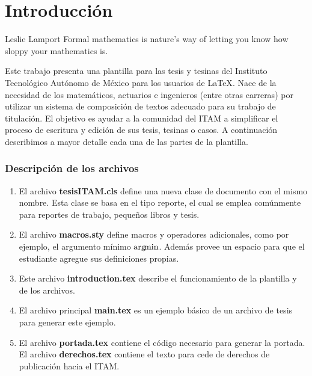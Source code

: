 \chapter{Introducción}
\label{ch:intro}

\begin{chapterquote}{Leslie Lamport}
	Formal mathematics is nature's way of letting you know how sloppy
your mathematics is.
\end{chapterquote}

Este trabajo presenta una plantilla para las tesis y tesinas del Instituto Tecnológico Autónomo de México para los usuarios de \LaTeX \cite{lamport1994latex}. Nace de la necesidad de los matemáticos, actuarios e ingenieros (entre otras carreras) por utilizar un sistema de composición de textos adecuado para su trabajo de titulación. El objetivo es ayudar a la comunidad del ITAM a simplificar el proceso de escritura y edición de sus tesis, tesinas o casos. A continuación describimos a mayor detalle cada una de las partes de la plantilla.

\subsection{Descripción de los archivos}
\begin{enumerate}
\item El archivo \textbf{tesisITAM.cls} define una nueva clase de documento con el mismo nombre. Esta clase se basa en el tipo reporte, el cual se emplea comúnmente para reportes de trabajo, pequeños libros y tesis.

\item El archivo \textbf{macros.sty} define macros y operadores adicionales, como por ejemplo, el argumento mínimo $\operatorname*{arg\! min}$. Además provee un espacio para que el estudiante agregue sus definiciones propias.

\item Este archivo \textbf{introduction.tex} describe el funcionamiento de la plantilla y de los archivos. 

\item El archivo principal \textbf{main.tex} es un ejemplo básico de un archivo de tesis para generar este ejemplo.

\item El archivo \textbf{portada.tex} contiene el código necesario para generar la portada. El archivo \textbf{derechos.tex} contiene el texto para cede de derechos de publicación hacia el ITAM.
\end{enumerate}

